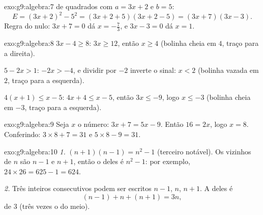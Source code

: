 \begin{solution}{exo:g9:algebra:7}
 de quadrados com $a = 3x + 2$ e $b = 5$:
\[
E = (3x + 2)^2 - 5^2 = (3x + 2 + 5)(3x + 2 - 5) = (3x + 7)(3x - 3).
\]
Regra do  nulo: $3x + 7 = 0$ dá $x = -\frac73$, e
$3x - 3 = 0$ dá $x = 1$.
\end{solution}

\begin{solution}{exo:g9:algebra:8}
$3x - 4 \geq 8$: $3x \geq 12$, então $x \geq 4$ (bolinha cheia em $4$,
traço para a direita).

$5 - 2x > 1$: $-2x > -4$, e dividir por $-2$ inverte o sinal: $x < 2$
(bolinha vazada em $2$, traço para a esquerda).

$4(x+1) \leq x - 5$: $4x + 4 \leq x - 5$, então $3x \leq -9$, logo
$x \leq -3$ (bolinha cheia em $-3$, traço para a esquerda).
\end{solution}

\begin{solution}{exo:g9:algebra:9}
Seja $x$ o número: $3x + 7 = 5x - 9$. Então $16 = 2x$, logo $x = 8$.
Conferindo: $3 \times 8 + 7 = 31$ e $5 \times 8 - 9 = 31$.
\end{solution}

\begin{solution}{exo:g9:algebra:10}
\emph{1.} $(n+1)(n-1) = n^2 - 1$ (terceiro  notável). Os
vizinhos de $n$ são $n - 1$ e $n + 1$, então o  deles é
$n^2 - 1$: por exemplo, $24 \times 26 = 625 - 1 = 624$.

\emph{2.} Três inteiros consecutivos podem ser escritos $n - 1$, $n$,
$n + 1$. A  deles é
\[
(n-1) + n + (n+1) = 3n ,
\]
 de $3$ (três vezes o do meio).
\end{solution}

